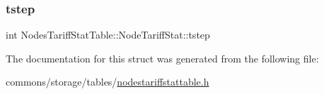 \subsubsection{\texorpdfstring{tstep}{tstep}}
{\footnotesize\ttfamily int Nodes\+Tariff\+Stat\+Table\+::\+Node\+Tariff\+Stat\+::tstep}



The documentation for this struct was generated from the following file\+:\begin{DoxyCompactItemize}
\item 
commons/storage/tables/\mbox{\hyperlink{nodestariffstattable_8h}{nodestariffstattable.\+h}}\end{DoxyCompactItemize}
